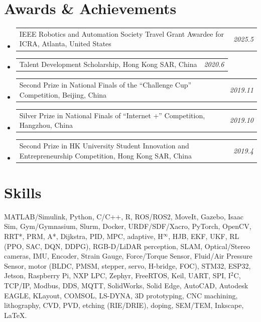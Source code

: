 \documentclass[a4paper,11pt]{article}
\makeatletter
\newcommand{\resumeProject}[2]{
  \vspace{0.5mm}\item
  \begin{tabular*}{0.98\textwidth}[t]{l@{\extracolsep{\fill}}r}
    \small{#1} & \textit{\footnotesize{#2}} \\
  \end{tabular*}
  \vspace{-2.4mm}
}
\newcommand{\resumeSubHeadingListStart}{\begin{itemize}[leftmargin=*,labelsep=0mm,itemsep=-2pt]}
\newcommand{\resumeSubHeadingListEnd}{\end{itemize}\vspace{2mm}}
\makeatother
\begin{document}
\section{\textbf{Awards \& Achievements}}
\vspace{-0.4mm}
\resumeSubHeadingListStart
  \resumeProject{IEEE Robotics and Automation Society Travel Grant Awardee for ICRA, Atlanta, United States}{2025.5}
  \resumeProject{Talent Development Scholarship, Hong Kong SAR, China}{2020.6}
  \resumeProject{Second Prize in National Finals of the “Challenge Cup” Competition, Beijing, China}{2019.11}
  \resumeProject{Silver Prize in National Finals of “Internet +” Competition, Hangzhou, China}{2019.10}
  \resumeProject{Second Prize in HK University Student Innovation and Entrepreneurship Competition, Hong Kong SAR, China}{2019.4}

\resumeSubHeadingListEnd
\vspace{-5mm}

\section{\textbf{Skills}}
\vspace{-0.4mm}

 \hspace{0.5em} MATLAB/Simulink, Python, C/C++, R, ROS/ROS2, MoveIt, Gazebo, Isaac Sim, Gym/Gymnasium, Slurm, Docker, URDF/SDF/Xacro, PyTorch, OpenCV, RRT*, PRM, A*, Dijkstra, PID, MPC, adaptive, H$^\infty$, HJB, EKF, UKF, RL (PPO, SAC, DQN, DDPG), RGB-D/LiDAR perception, SLAM, Optical/Stereo cameras, IMU, Encoder, Strain Gauge, Force/Torque Sensor, Fluid/Air Pressure Sensor, motor (BLDC, PMSM, stepper, servo, H-bridge, FOC), STM32, ESP32, Jetson, Raspberry Pi, NXP LPC, Zephyr, FreeRTOS, Keil, UART, SPI, I$^2$C, TCP/IP, Modbus, DDS, MQTT, SolidWorks, Solid Edge, AutoCAD, Autodesk EAGLE, KLayout, COMSOL, LS-DYNA, 3D prototyping, CNC machining, lithography, CVD, PVD, etching (RIE/DRIE), doping, SEM/TEM, Inkscape, \LaTeX.


\end{document}

